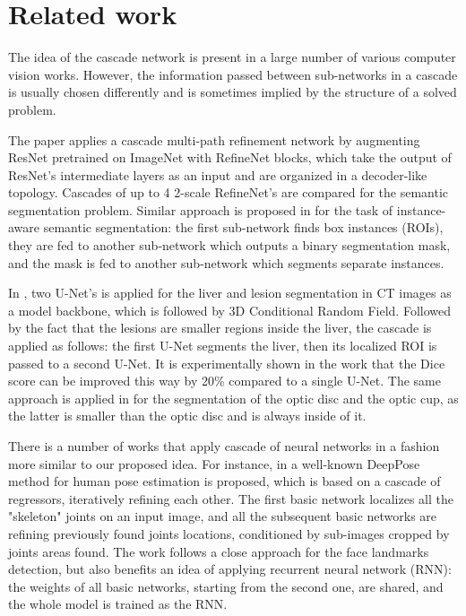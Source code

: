 \documentclass{llncs}
\begin{document}
\section{Related work}


The idea of the cascade network is present in a large number of  various computer vision works. However, the information passed between sub-networks in a cascade is usually chosen differently and is sometimes implied by the structure of a solved problem.

The paper \cite{lin2017refinenet} applies a cascade multi-path refinement network by augmenting ResNet \cite{resnet} pretrained on ImageNet \cite{imagenet} with RefineNet blocks, which take the output of ResNet’s intermediate layers as an input and are organized in a decoder-like topology. Cascades of up to 4 2-scale RefineNet's are compared for the semantic segmentation problem. %
Similar approach is proposed in \cite{dai2016instance} for the task of instance-aware semantic segmentation: the first sub-network finds box instances (ROIs), they are fed to another sub-network which outputs a binary segmentation mask, and the mask is fed to another sub-network which segments separate instances.
	
In \cite{christ2016automatic}, two U-Net’s is applied for the liver and lesion segmentation in CT images as a model backbone, which is followed by 3D Conditional Random Field. Followed by the fact that the lesions are smaller regions inside the liver, the cascade is applied as follows: the first U-Net segments the liver, then its localized ROI is passed to a second U-Net. It is experimentally shown in the work that the Dice score can be improved this way by 20\% compared to a single U-Net. The same approach is applied in \cite{sevastopolsky2017optic} for the segmentation of the optic disc and the optic cup, as the latter is smaller than the optic disc and is always inside of it.

There is a number of works that apply cascade of neural networks in a fashion more similar to our proposed idea. For instance, in \cite{toshev2014deeppose} a well-known DeepPose method for human pose estimation is proposed, which is based on a cascade of regressors, iteratively refining each other. The first basic network localizes all the "skeleton" joints on an input image, and all the subsequent basic networks are refining previously found joints locations, conditioned by sub-images cropped by joints areas found. The work \cite{trigeorgis2016mnemonic} follows a close approach for the face landmarks detection, but also benefits an idea of applying recurrent neural network (RNN): the weights of all basic networks, starting from the second one, are shared, and the whole model is trained as the RNN.
\end{document}
